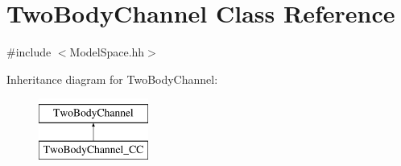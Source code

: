 \hypertarget{classTwoBodyChannel}{}\section{Two\+Body\+Channel Class Reference}
\label{classTwoBodyChannel}


{\ttfamily \#include $<$Model\+Space.\+hh$>$}

Inheritance diagram for Two\+Body\+Channel\+:\begin{figure}[H]
\begin{center}
\leavevmode
\includegraphics[height=2.000000cm]{classTwoBodyChannel}
\end{center}
\end{figure}

